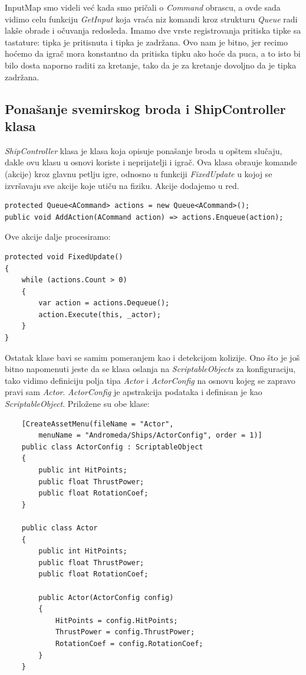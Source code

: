 InputMap smo videli ve\'c kada smo pri\v{c}ali o \emph{Command} obrascu, a ovde sada vidimo celu funkciju
\emph{GetInput} koja vra\'ca niz komandi kroz strukturu \emph{Queue} radi lak\v{s}e obrade i o\v{c}uvanja redosleda.
Imamo dve vrste registrovanja pritiska tipke sa tastature: tipka je pritisnuta i tipka je zadr\v{z}ana. Ovo nam je bitno,
jer recimo ho\'cemo da igra\v{c} mora konstantno da pritiska tipku ako ho\'ce da puca, a to isto bi bilo dosta
naporno raditi za kretanje, tako da je za kretanje dovoljno da je tipka zadr\v{z}ana.

\subsection{Pona\v{s}anje svemirskog broda i ShipController klasa}
\emph{ShipController} klasa je klasa koja opisuje pona\v{s}anje broda u op\v{s}tem slu\v{c}aju, dakle ovu klasu 
u osnovi koriste i neprijatelji i igra\v{c}. Ova klasa obra\dj uje komande (akcije) kroz glavnu petlju igre, odnosno
u funkciji \emph{FixedUpdate} u kojoj se izvr\v{s}avaju sve akcije koje uti\v{c}u na fiziku. Akcije dodajemo
u red.

\begin{verbatim}
protected Queue<ACommand> actions = new Queue<ACommand>();
public void AddAction(ACommand action) => actions.Enqueue(action);
\end{verbatim}

Ove akcije dalje procesiramo:

\begin{verbatim}
protected void FixedUpdate()
{
    while (actions.Count > 0)
    {
        var action = actions.Dequeue();
        action.Execute(this, _actor);
    }
}
\end{verbatim}

Ostatak klase bavi se samim pomeranjem kao i detekcijom kolizije. Ono \v{s}to je jo\v{s} bitno
napomenuti jeste da se klasa oslanja na \emph{ScriptableObjects} za konfiguraciju, tako vidimo definiciju 
polja tipa \emph{Actor} i \emph{ActorConfig} na osnovu kojeg se zapravo pravi sam \emph{Actor}. \emph{ActorConfig} je
apstrakcija podataka i definisan je kao \emph{ScriptableObject}. Prilo\v{z}ene su obe klase:

\begin{verbatim}
    [CreateAssetMenu(fileName = "Actor", 
        menuName = "Andromeda/Ships/ActorConfig", order = 1)]
    public class ActorConfig : ScriptableObject
    {
        public int HitPoints;
        public float ThrustPower;
        public float RotationCoef;
    }

    public class Actor
    {
        public int HitPoints;
        public float ThrustPower;
        public float RotationCoef;

        public Actor(ActorConfig config)
        {
            HitPoints = config.HitPoints;
            ThrustPower = config.ThrustPower;
            RotationCoef = config.RotationCoef;
        }
    }
\end{verbatim}

